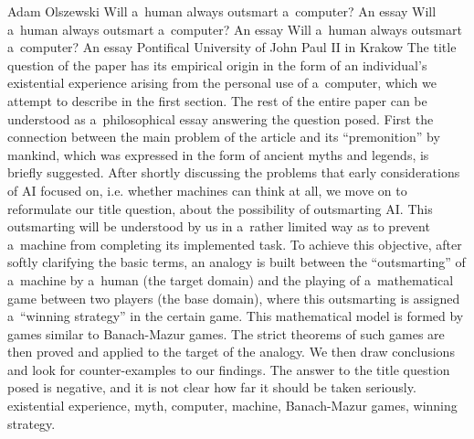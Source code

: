 \begin{artengenv}{Adam Olszewski}
	{Will a~human always outsmart a~computer? An essay}
	{Will a~human always outsmart a~computer? An essay}
	{Will a~human always outsmart a~computer? An essay}
	{Pontifical University of John Paul II in Krakow}
	{The title question of the paper has its empirical origin in the form of an individual's existential experience arising from the personal use of a~computer, which we attempt to describe in the first section. The rest of the entire paper can be understood as a~philosophical essay answering the question posed. First the connection between the main problem of the article and its ``premonition'' by mankind, which was expressed in the form of ancient myths and legends, is briefly suggested. After shortly discussing the problems that early considerations of AI focused on, i.e. whether machines can think at all, we move on to reformulate our title question, about the possibility of outsmarting AI. This outsmarting will be understood by us in a~rather limited way as to prevent a~machine from completing its implemented task. To achieve this objective, after softly clarifying the basic terms, an analogy is built between the ``outsmarting'' of a~machine by a~human (the target domain) and the playing of a~mathematical game between two players (the base domain), where this outsmarting is assigned a~``winning strategy'' in the certain game. This mathematical model is formed by games similar to Banach-Mazur games. The strict theorems of such games are then proved and applied to the target of the analogy. We then draw conclusions and look for counter-examples to our findings. The answer to the title question posed is negative, and it is not clear how far it should be taken seriously.
	}
	{existential experience, myth, computer, machine, Banach-Mazur games, winning strategy.}
	
	\setcounter{section}{-1}
	

\end{artengenv}
